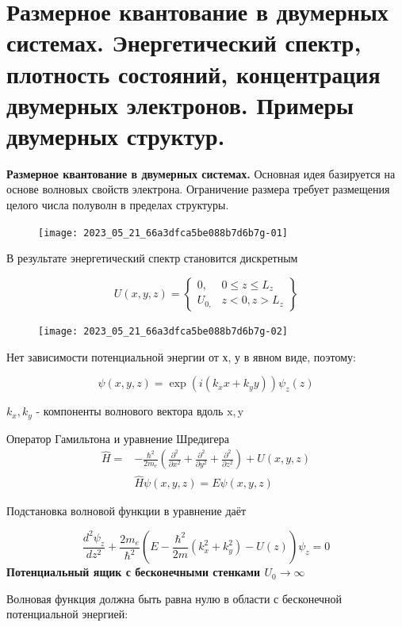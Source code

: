 \section{Размерное квантование в двумерных системах.  Энергетический спектр, плотность состояний, концентрация двумерных электронов. Примеры двумерных структур.}

\textbf{Размерное квантование в двумерных системах.}
Основная идея базируется на основе волновых свойств электрона.
Ограничение размера требует размещения целого числа полуволн в
пределах структуры.
\begin{figure} [h!]
    \centering
    \texttt{[image: 2023\_05\_21\_66a3dfca5be088b7d6b7g-01]}
\end{figure}

В результате энергетический спектр становится дискретным

$$
U(x, y, z)=\left\{\begin{array}{cc}
0, & 0 \leq z \leq L_{z} \\
U_{0,} & z<0, z>L_{z}
\end{array}\right\}
$$

\begin{figure}[h!]
    \centering
    \texttt{[image: 2023\_05\_21\_66a3dfca5be088b7d6b7g-02]}
\end{figure}


Нет зависимости потенциальной энергии от х, у в явном виде, поэтому:

$$
\psi(x, y, z)=\exp \left(i\left(k_{x} x+k_{y} y\right)\right) \psi_{z}(z)
$$

$k_{x}, k_{y}$ - компоненты волнового вектора вдоль $\mathrm{x}, \mathrm{y}$

Оператор Гамильтона и уравнение Шредигера
$$
\begin{aligned}
\hat{H}= & -\frac{\hbar^{2}}{2 m_{e}}\left(\frac{\partial^{2}}{\partial x^{2}}+\frac{\partial^{2}}{\partial y^{2}}+\frac{\partial^{2}}{\partial z^{2}}\right)+U(x, y, z) \\
& \hat{H} \psi(x, y, z)=E \psi(x, y, z)
\end{aligned}
$$

Подстановка волновой функции в уравнение даёт

$$
\frac{d^{2} \psi_{z}}{d z^{2}}+\frac{2 m_{e}}{\hbar^{2}}\left(E-\frac{\hbar^{2}}{2 m}\left(k_{x}^{2}+k_{y}^{2}\right)-U(z)\right) \psi_{z}=0
$$
\textbf{Потенциальный ящик с бесконечными стенками $
U_{0} \rightarrow \infty$}

Волновая функция должна быть равна нулю в области с бесконечной потенциальной энергией:

